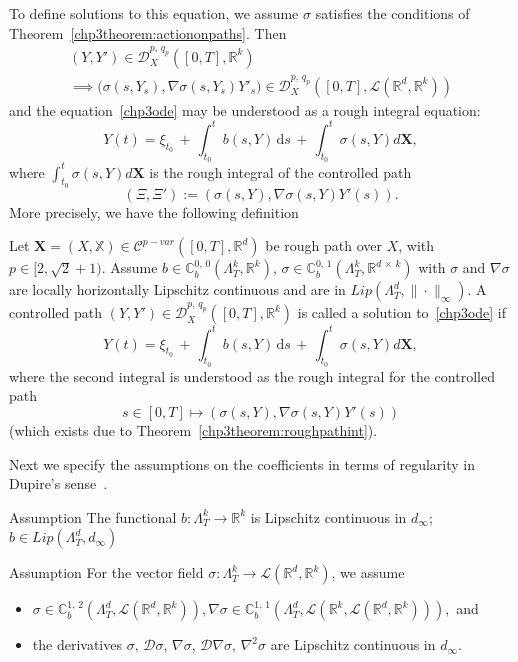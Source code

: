 \documentclass[AHL,Unicode,longabstracts,published]{cedram}
\renewcommand*\d{\mathrm{d}}
\newcommand{\scrD}{\mathscr{D}}
\newcommand{\bbX}{\mathbb{X}}
\newcommand{\bbC}{\mathbb{C}}
\newcommand{\calD}{\mathcal{D}}
\newcommand{\calL}{\mathcal{L}}
\newcommand{\calC}{\mathcal{C}}
\newcommand{\Rr}{{\mathbb{R}}}
\begin{document}
To define solutions to this equation, we assume $\sigma$ satisfies the conditions of Theorem~\ref{chp3theorem:actiononpaths}. Then
\begin{multline*}
\left(Y, Y'\right)\in\scrD^{p,\,q_p}_{X} \left([0,T],\Rr^k\right)\\
\implies\big(\sigma\left(s,Y_s\right), \nabla \sigma\left(s,Y_s\right)Y'_s\big)\in \scrD^{p,\,q_p}_{X}\left([0,T],\calL\left(\Rr^d,\Rr^k\right)\right)
\end{multline*}
and the equation~\eqref{chp3ode} may be understood as a rough integral equation:
\[
Y(t)=\xi_{t_0}\,+\, \int_{t_0}^t b(s, Y)\, \d s\,+\,\int_{t_0}^t \sigma(s, Y) d\bm{X},
\]
where $\int_{t_0}^t \sigma(s, Y) d\bm{X}$ is the rough integral of the controlled path
\[
\left(\Xi, \Xi'\right):=\left(\sigma(s,Y), \nabla \sigma(s,Y)Y'(s)\right).
\]
More precisely, we have the following definition

\begin{defi}\label{chp3def.odesol}
Let $\bm{X}=(X, \bbX)\in \calC^{p-var}([0,T],\Rr^d)$ be rough path over $X$, with $p\in [2, \sqrt{2}+1)$. Assume $b\in \bbC^{0,\,0}_b(\Lambda^k_T,\Rr^k),\, \sigma\in \bbC^{0,\,1}_b(\Lambda^k_T,\Rr^{d\,\times\,k})$ with $\sigma$ and $ \nabla \sigma$ are locally horizontally Lipschitz continuous and are in $Lip(\Lambda^d_T, \|\cdot\|_{\infty})$. A controlled path $(Y, Y')\in\scrD^{p,\,q_p}_{X}([0,T],\Rr^k)$ is called a solution to~\eqref{chp3ode} if
\begin{equation}\label{chp3eq:odedef}
Y(t)=\xi_{t_0}\,+\, \int_{t_0}^t b(s, Y)\, \d s\,+\,\int_{t_0}^t \sigma(s, Y) d\bm{X},
\end{equation}
where the second integral is understood as the rough integral for the controlled path
\[
s\in[0,T]\mapsto \left(\sigma(s,Y), \nabla \sigma(s,Y)Y'(s)\right)
\]
(which exists due to Theorem~\ref{chp3theorem:roughpathint}).
\end{defi}

Next we specify the assumptions on the coefficients in terms of regularity in Dupire's sense~\cite{CF09,D09}.

\begin{enonce}{Assumption}\label{ass:b}
The functional $b\colon \Lambda_T^k\to\Rr^k$ is Lipschitz continuous in $d_{\infty}$; $b\in Lip(\Lambda^{d}_T, d_{\infty})$
\end{enonce}

\begin{enonce}{Assumption}\label{ass:sigma}
For the vector field $\sigma\colon \Lambda_T^k \to \calL(\Rr^d,\Rr^k)$, we assume
\begin{itemize}
\item $\sigma\in \bbC^{1,\,2}_b(\Lambda^{d}_T, \calL(\Rr^d,\Rr^k)), \nabla \sigma\in \bbC^{1,\,1}_b(\Lambda^{d}_T, \calL(\Rr^k,\calL(\Rr^d,\Rr^k))),$ and
\item the derivatives $\sigma,\, \calD \sigma,\, \nabla \sigma,\,\calD\nabla \sigma,\, \nabla^2 \sigma$ are Lipschitz continuous in $d_{\infty}$.
\end{itemize}
\end{enonce}
\end{document}

